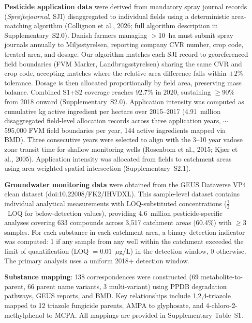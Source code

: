 \documentclass[12pt,a4paper]{article}
\begin{document}
\textbf{Pesticide application data} were derived from mandatory spray journal records (\textit{Spr\o jtejournal}, SJI) disaggregated to individual fields using a deterministic area-matching algorithm (Collignon et al., 2026; full algorithm description in Supplementary~S2.0). Danish farmers managing $>$10~ha must submit spray journals annually to Milj\o styrelsen, reporting company CVR number, crop code, treated area, and dosage. Our algorithm matches each SJI record to georeferenced field boundaries (FVM Marker, Landbrugsstyrelsen) sharing the same CVR and crop code, accepting matches where the relative area difference falls within $\pm2\%$ tolerance. Dosage is then allocated proportionally by field area, preserving mass balance. Combined S1+S2 coverage reaches 92.7\% in 2020, sustaining $\geq$90\% from 2018 onward (Supplementary~S2.0). Application intensity was computed as cumulative kg active ingredient per hectare over 2015--2017 (4.91~million disaggregated field-level allocation records across three application years, $\sim$595,000 FVM field boundaries per year, 144 active ingredients mapped via BMD). Three consecutive years were selected to align with the 3--10 year vadose zone transit time for shallow monitoring wells (Rosenbom et al., 2015; Kj\ae r et al., 2005). Application intensity was allocated from fields to catchment areas using area-weighted spatial intersection (Supplementary~S2.1).

\textbf{Groundwater monitoring data} were obtained from the GEUS Dataverse VP4 clean dataset (doi:10.22008/FK2/IHVDXL). This sample-level dataset contains individual analytical measurements with LOQ-substituted concentrations ($\frac{1}{2}$~LOQ for below-detection values), providing 4.6~million pesticide-specific analyses covering 633 compounds across 3,517 catchment areas (60.4\%) with $\geq$3 samples. For each substance in each catchment area, a binary detection indicator was computed: 1 if any sample from any well within the catchment exceeded the limit of quantification (LOQ $= 0.01$~$\mu$g/L) in the detection window, 0 otherwise. The primary analysis uses a uniform 2018+ detection window.

\textbf{Substance mapping}: 138 correspondences were constructed (69 metabolite-to-parent, 66 parent name variants, 3 multi-variant) using PPDB degradation pathways, GEUS reports, and BMD. Key relationships include 1,2,4-triazole mapped to 12 triazole fungicide parents, AMPA to glyphosate, and 4-chloro-2-methylphenol to MCPA. All mappings are provided in Supplementary Table~S1.
\end{document}
